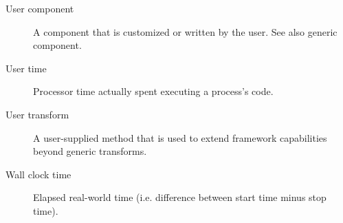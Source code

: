 \begin{description}
\item [User component] \label{UserComp} A component that is customized or
written by the user.  See also generic component.

\item [User time] \label{UserTime} Processor time actually spent executing a process's code.

\item[User transform] \label{glos:UserTrans} A user-supplied 
  method that is used to extend framework capabilities beyond generic 
  transforms.  

\item [Wall clock time] \label{WallClockTime} Elapsed real-world time (i.e. difference between start time minus
stop time).

\end{description}








































